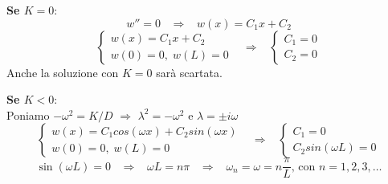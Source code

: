 {\bf Se $K=0$}:
\[
	w''=0
	\;\;\;
	\Rightarrow
	\;\;\;
	w(x)=C_1x + C_2
\]
\[
	\left\{
	\begin{array}{l}
		w(x)=C_1x + C_2\\
		w(0)=0, \; w(L)=0
	\end{array}
	\right.
	\;\;\;
	\Rightarrow
	\;\;\;
	\left\{
	\begin{array}{l}
		C_1=0\\
		C_2=0
	\end{array}
	\right.
\]
Anche la soluzione con $K=0$ sar\`a scartata.

{\bf Se $K<0$}:\\
Poniamo $-\omega^2 = K/D$ $\Rightarrow$ $\lambda^2 = - \omega^2$ e $\lambda=\pm i\omega$
\[
	\left\{
	\begin{array}{l}
		w(x)=C_1 cos(\omega x) + C_2 sin(\omega x)\\
		w(0)=0, \; w(L)=0
	\end{array}
	\right.
	\;\;\;
	\Rightarrow
	\;\;\;
	\left\{
	\begin{array}{l}
		C_1=0\\
		C_2 sin(\omega L)= 0
	\end{array}
	\right.
\]
\[
	\sin (\omega L)=0
	\;\;\;
	\Rightarrow
	\;\;\;
	\omega L = n\pi
	\;\;\;
	\Rightarrow
	\;\;\;
	\omega_n= \omega= n \frac{\pi}{L} \text{, con }n=1,2,3,\ldots
\]
